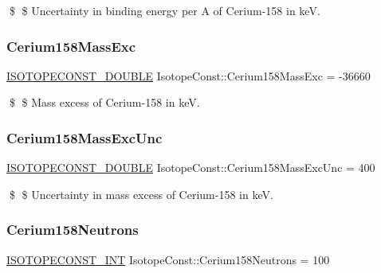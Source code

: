 \$ \$ Uncertainty in binding energy per A of Cerium-\/158 in keV. \mbox{\label{group___isotope_const-_cerium-_ce158_gabe7e50fb380285e4961268c44c3e0e0c}} 
\subsubsection{\texorpdfstring{Cerium158\+Mass\+Exc}{Cerium158MassExc}}
{\footnotesize\ttfamily \mbox{\hyperlink{group___isotope_const-_macros_ga8f45a7272ce02c0b4c65c44636ed719a}{I\+S\+O\+T\+O\+P\+E\+C\+O\+N\+S\+T\+\_\+\+D\+O\+U\+B\+LE}} Isotope\+Const\+::\+Cerium158\+Mass\+Exc = -\/36660}

\$ \$ Mass excess of Cerium-\/158 in keV. \mbox{\label{group___isotope_const-_cerium-_ce158_ga927a7997050a3e092d3efe02969faabc}} 
\subsubsection{\texorpdfstring{Cerium158\+Mass\+Exc\+Unc}{Cerium158MassExcUnc}}
{\footnotesize\ttfamily \mbox{\hyperlink{group___isotope_const-_macros_ga8f45a7272ce02c0b4c65c44636ed719a}{I\+S\+O\+T\+O\+P\+E\+C\+O\+N\+S\+T\+\_\+\+D\+O\+U\+B\+LE}} Isotope\+Const\+::\+Cerium158\+Mass\+Exc\+Unc = 400}

\$ \$ Uncertainty in mass excess of Cerium-\/158 in keV. \mbox{\label{group___isotope_const-_cerium-_ce158_ga3d5afd7b1ce190617f2fa071e402c6e6}} 
\subsubsection{\texorpdfstring{Cerium158\+Neutrons}{Cerium158Neutrons}}
{\footnotesize\ttfamily \mbox{\hyperlink{group___isotope_const-_macros_ga5f18360b3e99483a35c32d789e62621c}{I\+S\+O\+T\+O\+P\+E\+C\+O\+N\+S\+T\+\_\+\+I\+NT}} Isotope\+Const\+::\+Cerium158\+Neutrons = 100}

